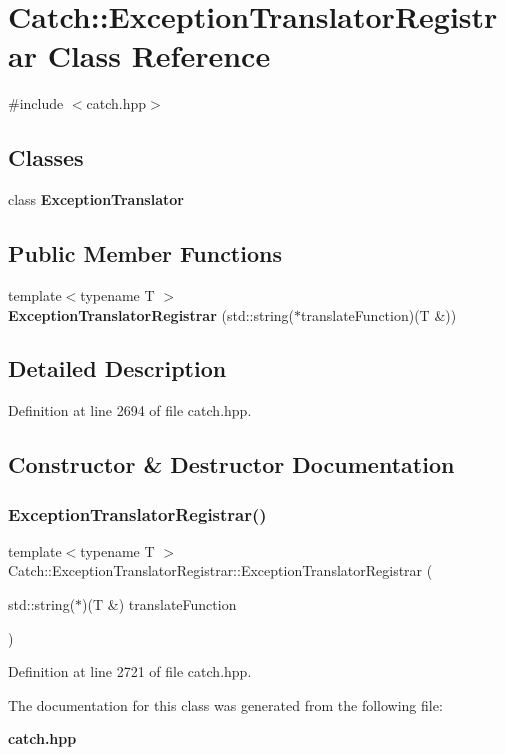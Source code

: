 \section{Catch\+::Exception\+Translator\+Registrar Class Reference}
\label{class_catch_1_1_exception_translator_registrar}


{\ttfamily \#include $<$catch.\+hpp$>$}

\subsection*{Classes}
\begin{DoxyCompactItemize}
\item 
class \textbf{ Exception\+Translator}
\end{DoxyCompactItemize}
\subsection*{Public Member Functions}
\begin{DoxyCompactItemize}
\item 
{\footnotesize template$<$typename T $>$ }\\\textbf{ Exception\+Translator\+Registrar} (std\+::string($\ast$translate\+Function)(T \&))
\end{DoxyCompactItemize}


\subsection{Detailed Description}


Definition at line 2694 of file catch.\+hpp.



\subsection{Constructor \& Destructor Documentation}
\mbox{\label{class_catch_1_1_exception_translator_registrar_aa73229de911f26b1df6c6c87c4d9e04e}} 
\subsubsection{ExceptionTranslatorRegistrar()}
{\footnotesize\ttfamily template$<$typename T $>$ \\
Catch\+::\+Exception\+Translator\+Registrar\+::\+Exception\+Translator\+Registrar (\begin{DoxyParamCaption}\item[{std\+::string($\ast$)(T \&)}]{translate\+Function }\end{DoxyParamCaption})\hspace{0.3cm}{\ttfamily [inline]}}



Definition at line 2721 of file catch.\+hpp.



The documentation for this class was generated from the following file\+:\begin{DoxyCompactItemize}
\item 
\textbf{ catch.\+hpp}\end{DoxyCompactItemize}
